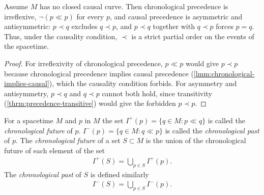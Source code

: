 \begin{theorem}
    \label{thrm:causal-order-refinements}
    \leanok
    Assume $M$ has no closed causal curve. Then chronological precedence is irreflexive, $\lnot(p \ll p)$ for every $p$, and causal precedence is asymmetric and antisymmetric: $p \prec q$ excludes $q \prec p$, and $p \prec q$ together with $q \prec p$ forces $p = q$. Thus, under the causality condition, $\prec$ is a strict partial order on the events of the spacetime.
\end{theorem}
\begin{proof}
    \leanok
    For irreflexivity of chronological precedence, $p \ll p$ would give $p \prec p$ because chronological precedence implies causal precedence (\ref{lmm:chronological-implies-causal}), which the causality condition forbids. For asymmetry and antisymmetry, $p \prec q$ and $q \prec p$ cannot both hold, since transitivity (\ref{thrm:precedence-transitive}) would give the forbidden $p \prec p$.
\end{proof}

\begin{definition}
    \label{def:chronological-future-and-chronological-past}
    \leanok
    For a spacetime $M$ and $p$ in $M$ the set $I^+(p) = \{q \in M : p \ll q\}$ is called the \textit{chronological future} of $p$. $I^-(p) = \{q \in M : q \ll p\}$ is called the \textit{chronological past} of $p$. The \textit{chronological future} of a set $S \subset M$ is the union of the chronological future of each element of the set
    \begin{align}
        I^+(S) = \bigcup\limits_{p \in S} I^+(p).
    \end{align}
    The \textit{chronological past} of $S$ is defined similarly
    \begin{align}
        I^-(S) = \bigcup\limits_{p \in S} I^-(p).
    \end{align}
\end{definition}

